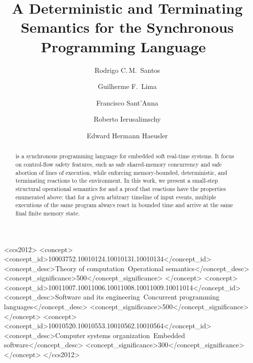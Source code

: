 \documentclass[sigplan, anonymous, review]{acmart}
\begin{document}
\title[A Memory-Bounded, Deterministic, and Terminating Semantics for \CEU]
{A Deterministic and Terminating Semantics
  for the Synchronous Programming Language~\CEU}

\author[R.\,C.\,M.~Santos]{Rodrigo C.\,M.~Santos}
%
\author[G.\,F.~Lima]{Guilherme F.~Lima}
%
\author[F.~Sant'Anna]{Francisco Sant'Anna}
%
\author[R.~Ierusalimschy]{Roberto Ierusalimschy}
%
\author[E.\,H.~Haeusler]{Edward Hermann Haeusler}

\begin{abstract}
\CEU is a synchronous programming language for embedded soft real-time systems.
%
It focus on control-flow safety features, such as safe shared-memory
concurrency and safe abortion of lines of execution, while enforcing
memory-bounded, deterministic, and terminating reactions to the environment.
%
In this work, we present a small-step structural operational semantics for
\CEU and a proof that reactions have the properties enumerated above:
%
that for a given arbitrary timeline of input events, multiple executions of the
same program always react in bounded time and arrive at the same final finite
memory state.
%
\end{abstract}


\begin{CCSXML}
<ccs2012>
 <concept>
  <concept_id>10003752.10010124.10010131.10010134</concept_id>
  <concept_desc>Theory of computation~Operational semantics</concept_desc>
  <concept_significance>500</concept_significance>
 </concept>
 <concept>
  <concept_id>10011007.10011006.10011008.10011009.10011014</concept_id>
  <concept_desc>Software and its
                engineering~Concurrent programming languages</concept_desc>
  <concept_significance>500</concept_significance>
 </concept>
 <concept>
  <concept_id>10010520.10010553.10010562.10010564</concept_id>
  <concept_desc>Computer systems
                organization~Embedded software</concept_desc>
  <concept_significance>300</concept_significance>
 </concept>
</ccs2012>
\end{CCSXML}

\maketitle











\end{document}
